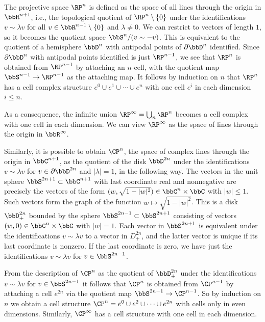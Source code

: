 \begin{example}\label{example CW structures of projective spaces}
    The projective space $\RP^n$  is defined as the space of all lines through the origin in $\bbR^{n+1}$, i.e., the topological quotient of
    $\RP^n\setminus \{0\}$ under the identifications $v\sim\lambda v$ for all $v\in \bbR^{n-1}\setminus \{0\}$ and $\lambda\neq 0$. We can restrict to vectors of length $1$, so it becomes the quotient space $\bbS^n\slash(v\sim -v)$. This is equivalent to the quotient of a hemisphere $\bbD^n$ with antipodal points of $\partial \bbD^n$ identified. Since $\partial \bbD^n$ with antipodal points identified is just $\RP^{n-1}$, we see that $\RP^n$ is obtained from $\RP^{n-1}$ by attaching an $n$-cell, with the quotient map $\bbS^{n-1}\to \RP^{n-1}$ as the attaching map. It follows by induction on $n$ that $\RP^n$ has a cell complex structure $e^0\cup e^1\cup \cdots \cup e^n$ with one cell $e^i$ in each dimension $i\leq n$.

    As a consequence, the infinite union $\RP^\infty=\bigcup_n \RP^n$ becomes a cell complex with one cell in each dimension. We can view $\RP^\infty$ as the space of lines through the origin in $\bbR^\infty$.

    Similarly, it is possible to obtain $\CP^n$, the space of complex lines through the origin in $\bbC^{n+1}$, as the quotient of the disk $\bbD^{2n}$ under the identifications $v\sim\lambda v$ for $v\in\partial \bbD^{2n}$ and $|\lambda|=1$, in the following way. The vectors in the unit sphere $\bbS^{2n+1}\subset\bbC^{n+1}$ with last coordinate real and nonnegative are precisely the vectors of the form $(w,\sqrt{1-|w|^2})\in\bbC^n\times \bbC$ with $|w|\leq 1$. Such vectors form the graph of the function $w\mapsto \sqrt{1-|w|^2}$. This is a disk $\bbD^{2n}_+$ bounded by the sphere $\bbS^{2n-1}\subset \bbS^{2n+1}$ consisting of vectors $(w,0)\in\bbC^n\times\bbC$ with $|w|=1$. Each vector in $\bbS^{2n+1}$ is equivalent under the identifications $v\sim\lambda v$ to a vector in $D_+^{2n}$, and the latter vector is unique if its last coordinate is nonzero. If the last coordinate is zero, we have just the identifications $v\sim\lambda v$ for $v\in \bbS^{2n-1}$.

    From the description of $\CP^n$ as the quotient of $\bbD^{2n}_+$ under the identifications $v\sim\lambda v$ for $v\in \bbS^{2n-1}$ it follows that $\CP^n$ is obtained from $\CP^{n-1}$ by attaching a cell $e^{2n}$ via the quotient map $\bbS^{2n-1}\to \CP^{n-1}$. So by induction on $n$ we obtain a cell structure $\CP^n=e^0\cup e^2\cup\cdots \cup e^{2n}$ with cells only in even dimensions. Similarly, $\CP^\infty$ has a cell structure with one cell in each dimension.
\end{example}




